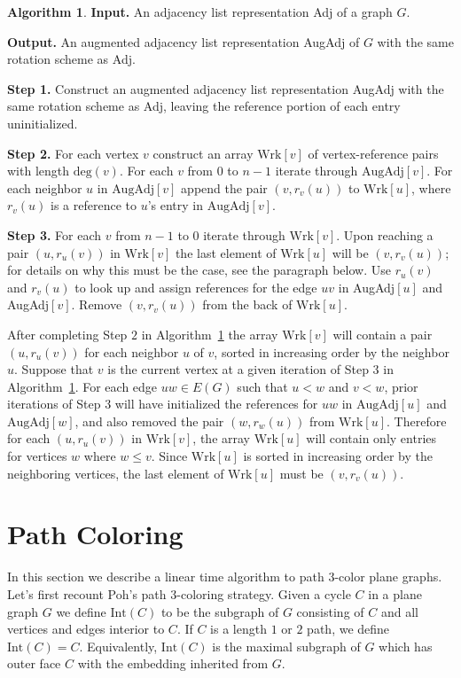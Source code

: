 \documentclass[12pt,letterpaper]{article}
\theoremstyle{plain}
\theoremstyle{definition}
\theoremstyle{break}
\newtheorem{algorithm}[lemma]{Algorithm}     %
\begin{document}
\begin{algorithm}\label{A:augment}
\textbf{Input.} An adjacency list representation Adj of a graph $G$.

\textbf{Output.} An augmented adjacency list representation AugAdj of
$G$ with the same rotation scheme as Adj.

\textbf{Step 1.} Construct an augmented adjacency list representation AugAdj
with the same rotation scheme as Adj, leaving the reference portion of each
entry uninitialized.

\textbf{Step 2.} For each vertex $v$ construct an array $\text{Wrk}[v]$
of vertex-reference pairs with length $\text{deg}(v)$. For each $v$ from
$0$ to $n-1$ iterate through
$\text{AugAdj}[v]$. For each neighbor $u$ in $\text{AugAdj}[v]$ append the pair
$(v,r_v(u))$ to
$\text{Wrk}[u]$, where $r_v(u)$ is a reference to $u$'s entry in
$\text{AugAdj}[v]$.

\textbf{Step 3.} For each $v$ from $n-1$ to $0$ iterate through
$\text{Wrk}[v]$. Upon reaching a pair $(u,r_u(v))$ in $\text{Wrk}[v]$ the
last element of $\text{Wrk}[u]$ will be $(v,r_v(u))$; for details on why this
must be the case, see the paragraph below. Use
$r_u(v)$ and $r_v(u)$ to look up and assign references for the edge $uv$ in
AugAdj$[u]$ and AugAdj$[v]$. Remove $(v,r_v(u))$ from the back of
$\text{Wrk}[u]$.
\end{algorithm}

After completing Step $2$ in Algorithm~\ref{A:augment} the array $\text{Wrk}[v]$
will contain
a pair $(u,r_u(v))$ for each neighbor $u$ of $v$, sorted in increasing order by
the neighbor $u$.
Suppose that $v$ is the current vertex at a given iteration of Step $3$ in
Algorithm~\ref{A:augment}. For each edge $uw\in E(G)$ such that
$u<w$ and $v<w$, prior iterations of Step 3 will have initialized the
references for $uw$ in $\text{AugAdj}[u]$ and $\text{AugAdj}[w]$, and also
removed the pair
$(w,r_w(u))$ from $\text{Wrk}[u]$. Therefore for each $(u,r_u(v))$ in
$\text{Wrk}[v]$, the array $\text{Wrk}[u]$ will contain only entries for
vertices $w$ where $w\le v$. Since $\text{Wrk}[u]$ is sorted in
increasing order by the neighboring vertices, the last element of
$\text{Wrk}[u]$ must be $(v,r_v(u))$.

\section{Path Coloring}

In this section we describe a linear time algorithm to path $3$-color
plane graphs. Let's first recount Poh's path $3$-coloring strategy.
Given a cycle $C$ in a plane graph $G$ we define $\text{Int}(C)$ to
be the subgraph of $G$ consisting of $C$ and all vertices and edges interior to
$C$. If $C$ is a length $1$ or $2$ path, we define $\text{Int}(C)=C$.
Equivalently, $\text{Int}(C)$ is the maximal subgraph of
$G$ which has outer face $C$ with the embedding inherited from $G$.
\end{document}
